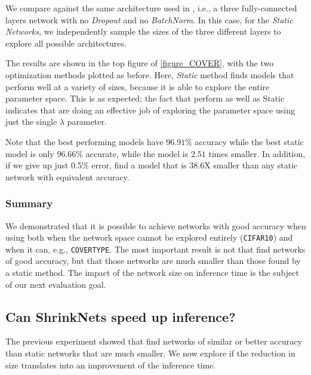 We compare \shrink against the same architecture
used in \cite{Scardapane2017}, i.e., a three fully-connected layers network with no
\textit{Dropout} \cite{Srivastava2014} and no \textit{BatchNorm}. 
In this case, for the \textit{Static Networks}, we independently sample the
sizes of the three different layers to explore all possible architectures.

The results are shown in the top figure of \cref{figure_COVER}, with the two
optimization methods plotted as before. Here, {\it Static} method finds models
that perform well at a variety of sizes, because it is able to explore the
entire parameter space.  This is as expected;  the fact that \shrink perform
as well as Static indicates that \shrink are doing an effective job of
exploring the parameter space using just the single $\lambda$ parameter.

Note that the best performing \shrink models have $96.91\%$ accuracy while the
best static model is only $96.66\%$ accurate, while the \shrink model is $2.51$
times smaller. In addition, if we give up just 0.5\% error, \shrink find a
model that is 38.6X smaller than any static network with equivalent accuracy.


\subsubsection{Summary}

We  demonstrated that it is possible to achieve networks with good accuracy
when using \shrink both when the network space cannot be explored entirely
(\texttt{CIFAR10}) and when it can, e.g., \texttt{COVERTYPE}. The most important
result is not that \shrink find networks of good accuracy, but that those
networks are much smaller than those found by a static method. The impact of the
network size on inference time is the subject of our next evaluation goal.


\subsection{Can ShrinkNets speed up inference?}

The previous experiment showed that \shrink find networks of similar or better accuracy
than static networks that are much smaller. We now explore if the reduction in size
translates into an improvement of the inference time.

